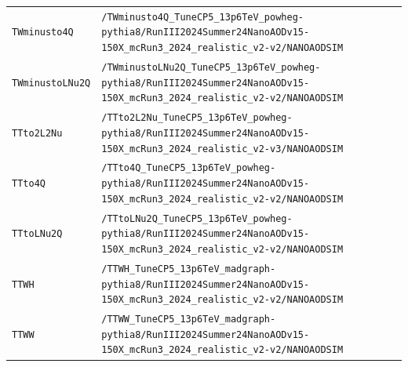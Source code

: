 \begin{longtable}{@{}>{\RaggedRight\arraybackslash}p{} >{\RaggedRight\arraybackslash}p{}@{}}
\addlinespace[2pt]
\texttt{TWminusto4Q} & \texttt{/\allowbreak{}TWminusto4Q\_\allowbreak{}TuneCP5\_\allowbreak{}13p6TeV\_\allowbreak{}powheg-\allowbreak{}pythia8/\allowbreak{}RunIII2024Summer24NanoAODv15-\allowbreak{}150X\_\allowbreak{}mcRun3\_\allowbreak{}2024\_\allowbreak{}realistic\_\allowbreak{}v2-\allowbreak{}v2/\allowbreak{}NANOAODSIM} \\
\addlinespace[2pt]
\texttt{TWminustoLNu2Q} & \texttt{/\allowbreak{}TWminustoLNu2Q\_\allowbreak{}TuneCP5\_\allowbreak{}13p6TeV\_\allowbreak{}powheg-\allowbreak{}pythia8/\allowbreak{}RunIII2024Summer24NanoAODv15-\allowbreak{}150X\_\allowbreak{}mcRun3\_\allowbreak{}2024\_\allowbreak{}realistic\_\allowbreak{}v2-\allowbreak{}v2/\allowbreak{}NANOAODSIM} \\
\addlinespace[2pt]
\texttt{TTto2L2Nu} & \texttt{/\allowbreak{}TTto2L2Nu\_\allowbreak{}TuneCP5\_\allowbreak{}13p6TeV\_\allowbreak{}powheg-\allowbreak{}pythia8/\allowbreak{}RunIII2024Summer24NanoAODv15-\allowbreak{}150X\_\allowbreak{}mcRun3\_\allowbreak{}2024\_\allowbreak{}realistic\_\allowbreak{}v2-\allowbreak{}v3/\allowbreak{}NANOAODSIM} \\
\addlinespace[2pt]
\texttt{TTto4Q} & \texttt{/\allowbreak{}TTto4Q\_\allowbreak{}TuneCP5\_\allowbreak{}13p6TeV\_\allowbreak{}powheg-\allowbreak{}pythia8/\allowbreak{}RunIII2024Summer24NanoAODv15-\allowbreak{}150X\_\allowbreak{}mcRun3\_\allowbreak{}2024\_\allowbreak{}realistic\_\allowbreak{}v2-\allowbreak{}v2/\allowbreak{}NANOAODSIM} \\
\addlinespace[2pt]
\texttt{TTtoLNu2Q} & \texttt{/\allowbreak{}TTtoLNu2Q\_\allowbreak{}TuneCP5\_\allowbreak{}13p6TeV\_\allowbreak{}powheg-\allowbreak{}pythia8/\allowbreak{}RunIII2024Summer24NanoAODv15-\allowbreak{}150X\_\allowbreak{}mcRun3\_\allowbreak{}2024\_\allowbreak{}realistic\_\allowbreak{}v2-\allowbreak{}v2/\allowbreak{}NANOAODSIM} \\
\addlinespace[2pt]
\texttt{TTWH} & \texttt{/\allowbreak{}TTWH\_\allowbreak{}TuneCP5\_\allowbreak{}13p6TeV\_\allowbreak{}madgraph-\allowbreak{}pythia8/\allowbreak{}RunIII2024Summer24NanoAODv15-\allowbreak{}150X\_\allowbreak{}mcRun3\_\allowbreak{}2024\_\allowbreak{}realistic\_\allowbreak{}v2-\allowbreak{}v2/\allowbreak{}NANOAODSIM} \\
\addlinespace[2pt]
\texttt{TTWW} & \texttt{/\allowbreak{}TTWW\_\allowbreak{}TuneCP5\_\allowbreak{}13p6TeV\_\allowbreak{}madgraph-\allowbreak{}pythia8/\allowbreak{}RunIII2024Summer24NanoAODv15-\allowbreak{}150X\_\allowbreak{}mcRun3\_\allowbreak{}2024\_\allowbreak{}realistic\_\allowbreak{}v2-\allowbreak{}v2/\allowbreak{}NANOAODSIM} \\

\end{longtable}
